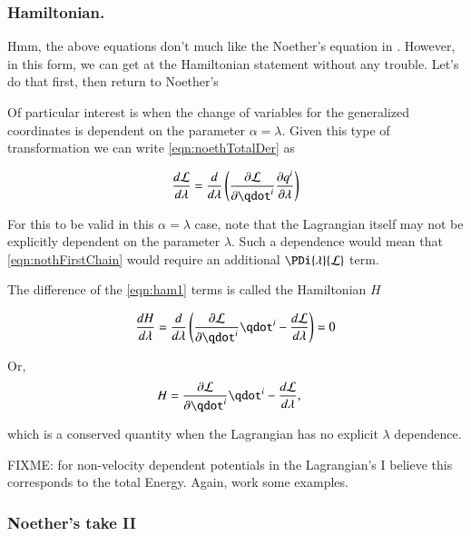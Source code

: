 \documentclass{article}
\begin{document}
\subsubsection{ Hamiltonian. }

Hmm, the above equations don't much like the Noether's equation in \cite{doran2003gap}.  However, in this form, we can get at the Hamiltonian statement
without any trouble.  Let's do that first, then return to Noether's

Of particular interest is when the change of variables for the generalized coordinates is dependent on the parameter $\alpha = \lambda$.
Given this type of transformation we can write
\ref{eqn:noethTotalDer} as

\begin{align}\label{eqn:ham1}
\frac{d\LL}{d\lambda} = \frac{d}{d\lambda} \left( \PD{\qdot^i}{\LL} \PD{\lambda}{q^i} \right)
\end{align}

For this to be valid in this $\alpha = \lambda$ case, note that the Lagrangian
itself may not be explicitly dependent on the parameter $\lambda$.  Such a dependence would mean that \ref{eqn:nothFirstChain}
would require an additional $\PDi{\lambda}{\LL}$ term.

The difference of the \ref{eqn:ham1} terms is called the Hamiltonian $H$

\begin{align*}
\frac{dH}{d\lambda} &= \frac{d}{d\lambda} \left( \PD{\qdot^i}{\LL} \qdot^i - \frac{d\LL}{d\lambda} \right) = 0 \\
\end{align*}

Or,
\begin{align*}
H &= \PD{\qdot^i}{\LL} \qdot^i - \frac{d\LL}{d\lambda},
\end{align*}

which is a conserved quantity 
when the Lagrangian has no explicit $\lambda$ dependence.

FIXME: for non-velocity dependent potentials in the Lagrangian's I believe
this corresponds to the total Energy.  Again, work some examples.

\subsubsection{ Noether's take II }
\end{document}
